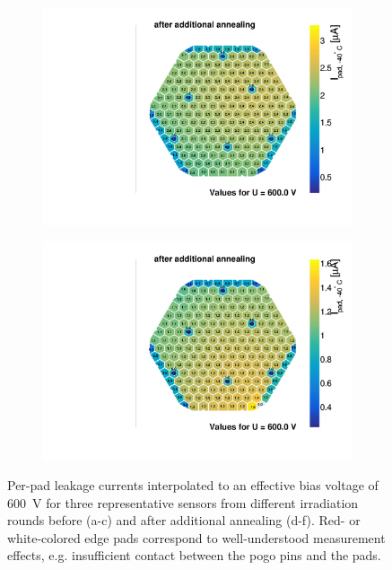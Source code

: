 \begin{figure}
\begin{subfigure}[b]{0.32\textwidth}
		\includegraphics[width=0.999\textwidth]{plots/iv_hexplots/0541_04_annealed.pdf}
		\subcaption{
		}
		\label{plot:iv_hexplot_0541_04_annealed}
	\end{subfigure}
	\hfill	
	\begin{subfigure}[b]{0.32\textwidth}
		\includegraphics[width=0.999\textwidth]{plots/iv_hexplots/1013_annealed.pdf}
		\subcaption{
		}
		\label{plot:iv_hexplot_1013_annealed}
	\end{subfigure}    
	\caption{
		Per-pad leakage currents interpolated to an effective bias voltage of \SI{600}{\volt} for three representative sensors from different irradiation rounds before (a-c) and after additional annealing (d-f).
		Red- or white-colored edge pads correspond to well-understood measurement effects, e.g. insufficient contact between the pogo pins and the pads.
		}
	\label{plot:iv_hexplot}
\end{figure}




